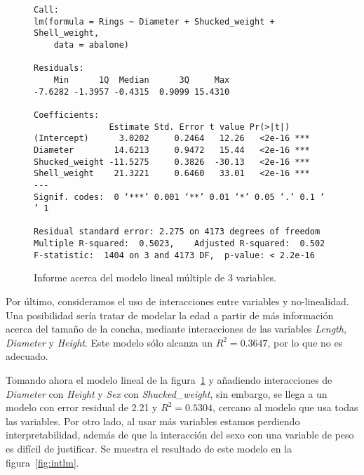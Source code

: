 \documentclass[a4paper, 11pt]{article}
\begin{document}
\begin{figure}[htbp]
  \begin{Verbatim}[fontsize=\scriptsize]
Call:
lm(formula = Rings ~ Diameter + Shucked_weight + Shell_weight, 
    data = abalone)

Residuals:
    Min      1Q  Median      3Q     Max 
-7.6282 -1.3957 -0.4315  0.9099 15.4310 

Coefficients:
               Estimate Std. Error t value Pr(>|t|)    
(Intercept)      3.0202     0.2464   12.26   <2e-16 ***
Diameter        14.6213     0.9472   15.44   <2e-16 ***
Shucked_weight -11.5275     0.3826  -30.13   <2e-16 ***
Shell_weight    21.3221     0.6460   33.01   <2e-16 ***
---
Signif. codes:  0 ‘***’ 0.001 ‘**’ 0.01 ‘*’ 0.05 ‘.’ 0.1 ‘ ’ 1

Residual standard error: 2.275 on 4173 degrees of freedom
Multiple R-squared:  0.5023,	Adjusted R-squared:  0.502 
F-statistic:  1404 on 3 and 4173 DF,  p-value: < 2.2e-16
  \end{Verbatim}
  \caption{\label{fig:3lm}Informe acerca del modelo lineal múltiple de 3 variables.}
  
\end{figure}

Por último, consideramos el uso de interacciones entre variables y no-linealidad. Una posibilidad sería tratar de modelar la edad a partir de más información acerca del tamaño de la concha, mediante interacciones de las variables \textit{Length}, \textit{Diameter} y \textit{Height}. Este modelo sólo alcanza un $R^2=0.3647$, por lo que no es adecuado.

Tomando ahora el modelo lineal de la figura~\ref{fig:3lm} y añadiendo interacciones de \textit{Diameter} con \textit{Height} y \textit{Sex} con \textit{Shucked\_weight}, sin embargo, se llega a un modelo con error residual de 2.21 y $R^2=0.5304$, cercano al modelo que usa todas las variables. Por otro lado, al usar más variables estamos perdiendo interpretabilidad, además de que la interacción del sexo con una variable de peso es difícil de justificar. Se muestra el resultado de este modelo en la figura~\ref{fig:intlm}. 
\end{document}
